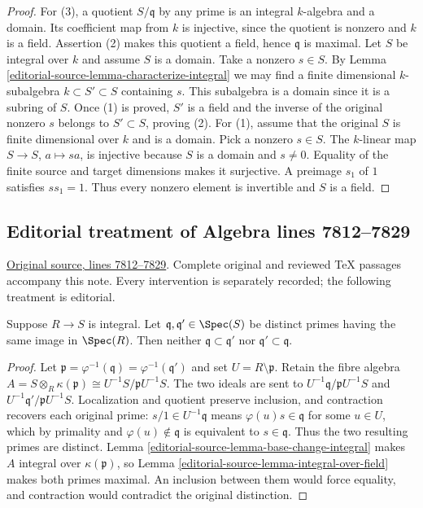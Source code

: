 \begin{proof}
For (3), a quotient $S/\mathfrak q$ by any prime is an integral
$k$-algebra and a domain. Its coefficient map from $k$ is injective,
since the quotient is nonzero and $k$ is a field. Assertion (2)
makes this quotient a field, hence $\mathfrak q$ is maximal.
Let $S$ be integral over $k$ and assume $S$ is a domain.
Take a nonzero $s\in S$. By Lemma
\ref{editorial-source-lemma-characterize-integral} we may find a
finite dimensional $k$-subalgebra $k \subset S' \subset S$
containing $s$. This subalgebra is a domain since it is a subring
of $S$. Once (1) is proved, $S'$ is a field and the inverse of
the original nonzero $s$ belongs to $S'\subset S$, proving (2).
For (1), assume that the original $S$ is finite dimensional over
$k$ and is a domain. Pick a nonzero $s\in S$. The $k$-linear
map $S\to S$, $a\mapsto sa$, is injective because $S$ is a
domain and $s\ne0$. Equality of the finite source and target
dimensions makes it surjective. A preimage $s_1$ of $1$ satisfies
$ss_1=1$. Thus every nonzero element is invertible and $S$ is a field.
\end{proof}


\subsection{Editorial treatment of Algebra lines 7812--7829}

\hypertarget{algebra-context-084}{}

\noindent\href{https://github.com/stacks/stacks-project/blob/a04446e57ec1fbc252a871afcec7752fb2807b14/algebra.tex\#L7812}{Original source, lines 7812--7829}. Complete original and reviewed TeX passages accompany this note. Every intervention is separately recorded; the following treatment is editorial.


\begin{lemma}
\label{editorial-source-lemma-integral-no-inclusion}
Suppose $R \to S$ is integral.
Let $\mathfrak q, \mathfrak q' \in \Spec(S)$
be distinct primes
having the same image in $\Spec(R)$.
Then neither $\mathfrak q \subset \mathfrak q'$
nor $\mathfrak q' \subset \mathfrak q$.
\end{lemma}

\begin{proof}
Let $\mathfrak p=\varphi^{-1}(\mathfrak q)=
\varphi^{-1}(\mathfrak q')$ and set $U=R\setminus\mathfrak p$.
Retain the fibre algebra
$A=S\otimes_R\kappa(\mathfrak p)\cong U^{-1}S/\mathfrak pU^{-1}S$.
The two ideals are sent to
$U^{-1}\mathfrak q/\mathfrak pU^{-1}S$ and
$U^{-1}\mathfrak q'/\mathfrak pU^{-1}S$. Localization and quotient
preserve inclusion, and contraction recovers each original prime:
$s/1\in U^{-1}\mathfrak q$ means
$\varphi(u)s\in\mathfrak q$ for some $u\in U$, which by primality
and $\varphi(u)\notin\mathfrak q$ is equivalent to $s\in\mathfrak q$.
Thus the two resulting primes are distinct. Lemma
\ref{editorial-source-lemma-base-change-integral} makes $A$ integral over
$\kappa(\mathfrak p)$, so Lemma \ref{editorial-source-lemma-integral-over-field}
makes both primes maximal. An inclusion between them would force
equality, and contraction would contradict the original distinction.
\end{proof}


